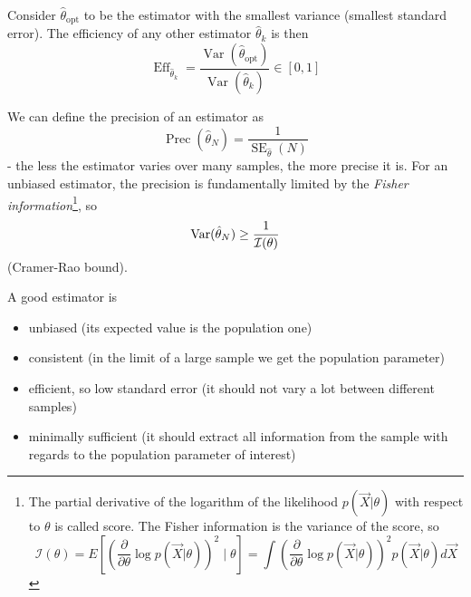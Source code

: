 Consider $\hat{\theta}_\text{opt}$ to be the estimator with the smallest variance (smallest standard error).
The efficiency of any other estimator $\hat{\theta}_k$ is then
\begin{equation}
    \operatorname{Eff}_{\hat{\theta}_k} = \frac{\operatorname{Var}(\hat{\theta}_\text{opt})}{\operatorname{Var}(\hat{\theta}_k)} \in [0,1]
\end{equation}

We can define the precision of an estimator as
\begin{equation}
    \operatorname{Prec}(\hat{\theta}_N) = \frac{1}{\operatorname{SE}_{\hat{\theta}}(N)}
\end{equation}
- the less the estimator varies over many samples, the more precise it is. For an
unbiased estimator, the precision is fundamentally limited by the \textit{Fisher information}\footnote{
    The partial derivative of the logarithm of the likelihood $p(\vec{X} | \theta)$ with respect to $\theta$ is called score.
    The Fisher information is the variance of the score, so
    \begin{equation}
        \mathcal{I}(\theta) = E\left[ \left( \frac{\partial}{\partial \theta} \log p(\vec{X} | \theta) \right)^2 \mid \theta \right] = \int \left( \frac{\partial}{\partial \theta} \log p(\vec{X} | \theta) \right)^2 p(\vec{X} | \theta) d\vec{X}
    \end{equation}
}, so
\begin{equation}
    \operatorname{Var}(\hat{\theta}_N) \geq \frac{1}{\mathcal{I}(\theta)}
\end{equation}
(Cramer-Rao bound).

A good estimator is
\begin{itemize}
    \item unbiased (its expected value is the population one)
    \item consistent (in the limit of a large sample we get the population parameter)
    \item efficient, so low standard error (it should not vary a lot between different samples)
    \item minimally sufficient (it should extract all information from the sample with regards to the population parameter of interest)
\end{itemize}

